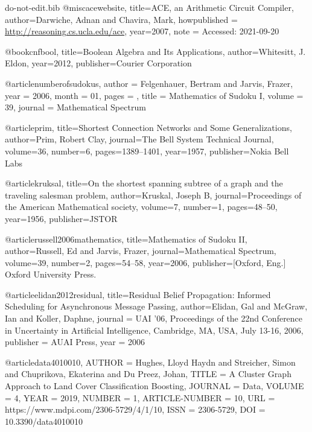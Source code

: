 \documentclass{ieeeaccess}
\begin{document}
{\begin{filecontents*}[overwrite]{do-not-edit.bib}
		@misc{acewebsite,
			title={{ACE}, an {A}rithmetic {C}ircuit {C}ompiler},
			author={Darwiche, Adnan and Chavira, Mark},
			howpublished = {\url{http://reasoning.cs.ucla.edu/ace}},
			year={2007},
			note = {Accessed: 2021-09-20}
		}
		
		@book{cnfbool,
			title={{B}oolean {A}lgebra and {I}ts {A}pplications},
			author={Whitesitt, J. Eldon},
			year={2012},
			publisher={Courier Corporation}
		}
		
		@article{numberofsudokus,
			author = {{F}elgenhauer, {B}ertram and {J}arvis, {F}razer},
			year = {2006},
			month = {01},
			pages = {},
			title = {Mathematics of {S}udoku {I}},
			volume = {39},
			journal = {Mathematical Spectrum}
		}
	
		@article{prim,
			title={{S}hortest {C}onnection {N}etworks and {S}ome {G}eneralizations},
			author={Prim, Robert Clay},
			journal={The Bell System Technical Journal},
			volume={36},
			number={6},
			pages={1389--1401},
			year={1957},
			publisher={Nokia Bell Labs}
		}
	
		@article{kruksal,
			title={On the shortest spanning subtree of a graph and the traveling salesman problem},
			author={Kruskal, Joseph B},
			journal={Proceedings of the American Mathematical society},
			volume={7},
			number={1},
			pages={48--50},
			year={1956},
			publisher={JSTOR}
		} 
			
		@article{russell2006mathematics,
			title={Mathematics of {S}udoku {II}},
			author={Russell, Ed and Jarvis, Frazer},
			journal={Mathematical Spectrum},
			volume={39},
			number={2},
			pages={54--58},
			year={2006},
			publisher={[Oxford, Eng.] Oxford University Press.}
		}
	
		@article{elidan2012residual,
			title={Residual {B}elief {P}ropagation: {I}nformed {S}cheduling for {A}synchronous {M}essage {P}assing},
			author={Elidan, Gal and McGraw, Ian and Koller, Daphne},
			journal = {{UAI} '06, {P}roceedings of the 22nd {C}onference in {U}ncertainty in {A}rtificial {I}ntelligence, {C}ambridge, {MA}, {USA}, {J}uly 13-16, 2006},
			publisher = {{AUAI} {P}ress},
			year = {2006}
		}
		
		@article{data4010010,
			AUTHOR = {Hughes, Lloyd Haydn and Streicher, Simon and Chuprikova, Ekaterina and Du Preez, Johan},
			TITLE = {{A} {C}luster {G}raph {A}pproach to {L}and {C}over {C}lassification {B}oosting},
			JOURNAL = {Data},
			VOLUME = {4},
			YEAR = {2019},
			NUMBER = {1},
			ARTICLE-NUMBER = {10},
			URL = {https://www.mdpi.com/2306-5729/4/1/10},
			ISSN = {2306-5729},
			DOI = {10.3390/data4010010}
			}


\end{filecontents*}}
\end{document}
